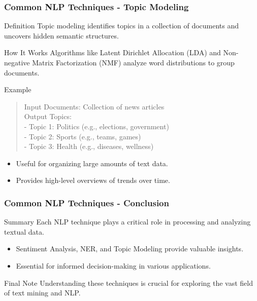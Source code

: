 \documentclass[aspectratio=169]{beamer}
\begin{document}
\begin{frame}[fragile]
    \frametitle{Common NLP Techniques - Topic Modeling}
    
    \begin{block}{Definition}
        Topic modeling identifies topics in a collection of documents and uncovers hidden semantic structures.
    \end{block}
    
    \begin{block}{How It Works}
        Algorithms like Latent Dirichlet Allocation (LDA) and Non-negative Matrix Factorization (NMF) analyze word distributions to group documents.
    \end{block}
    
    \begin{block}{Example}
        \begin{quote}
            Input Documents: Collection of news articles \\
            Output Topics: \\
            - Topic 1: Politics (e.g., elections, government) \\
            - Topic 2: Sports (e.g., teams, games) \\
            - Topic 3: Health (e.g., diseases, wellness)
        \end{quote}
    \end{block}

    \begin{itemize}
        \item Useful for organizing large amounts of text data.
        \item Provides high-level overviews of trends over time.
    \end{itemize}
\end{frame}

\begin{frame}[fragile]
    \frametitle{Common NLP Techniques - Conclusion}
    
    \begin{block}{Summary}
        Each NLP technique plays a critical role in processing and analyzing textual data.
    \end{block}

    \begin{itemize}
        \item Sentiment Analysis, NER, and Topic Modeling provide valuable insights.
        \item Essential for informed decision-making in various applications.
    \end{itemize}

    \begin{block}{Final Note}
        Understanding these techniques is crucial for exploring the vast field of text mining and NLP.
    \end{block}  
\end{frame}
\end{document}
